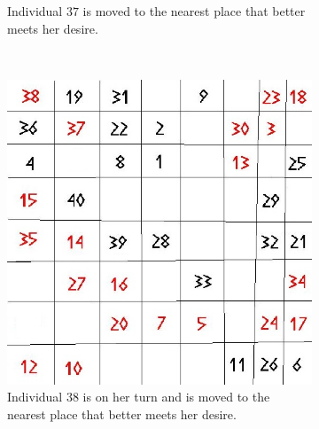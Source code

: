 \begin{figure}[H]
\begin{subfigure}{0.3\textwidth}
        \caption{Individual $37$ is moved to the nearest place that better meets her desire. }
        \label{fig:movement2}
    \end{subfigure}
    ~ %
    \begin{subfigure}{0.3\textwidth}
        \includegraphics[width=\textwidth]{Tegenvoorbeeld/segregation_tegenvb_2.jpg}
        \caption{Individual $38$ is on her turn and is moved to the nearest place that better meets her desire.}
        \label{fig:movement3}
    \end{subfigure}\hspace{1cm}
    \begin{subfigure}{0.3\textwidth}

\end{subfigure}
\end{figure}
